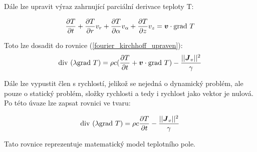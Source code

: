 Dále lze upravit výraz zahrnující parciální derivace teploty T:

\begin{equation}
    \frac{\partial T}{\partial t} + \frac{\partial T}{\partial r} v_r + \frac{\partial T}{\partial \alpha} v_\alpha + \frac{\partial T}{\partial z} v_z = \mbox{\boldmath$v$} \cdot \mathrm{grad}\  T
	\label{gradient_teplota} 
\end{equation} 

Toto lze dosadit do rovnice (\ref{fourier_kirchhoff_upraven}):
\begin{equation}
	\mathrm{div}\  ( \lambda  \mathrm{grad}\  T) = \rho c (\frac{\partial T}{\partial t} + \mbox{\boldmath$v$} \cdot \mathrm{grad}\  T ) - \frac{||\mbox{\boldmath$J$}_{v}||^{2}}{\gamma}
	\label{matematicky_model_teplotni_pole_rychlost} 
\end{equation} 

Dále lze vypustit člen s rychlostí, jelikož se nejedná o dynamický problém, ale pouze o statický problém, složky rychlosti a tedy i rychlost jako vektor je nulová. Po této úvaze lze zapsat rovnici ve tvaru:

\begin{equation}
	\mathrm{div}\  ( \lambda \mathrm{grad}\  T) = \rho c \frac{\partial T}{\partial t} - \frac{||\mbox{\boldmath$J$}_{v}||^{2}}{\gamma}
	\label{matematicky_model_teplotni_pole} 
\end{equation}

Tato rovnice reprezentuje matematický model teplotního pole.
